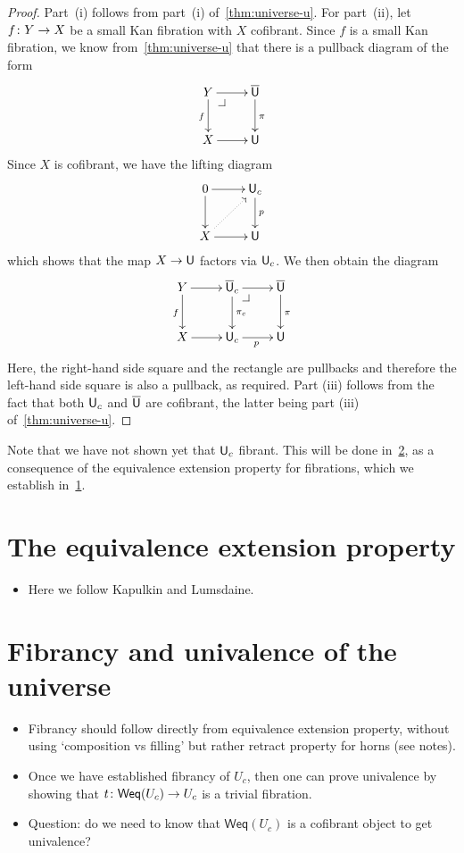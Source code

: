 \documentclass[reqno,10pt,a4paper,oneside,draft]{amsart}
\begin{document}
\begin{proof} Part~(i) follows from part~(i) of~\cref{thm:universe-u}. For part~(ii), 
let $f \colon Y \to X$ be a small Kan fibration with $X$ cofibrant. Since $f$ is a
small Kan fibration, we know 
from~\cref{thm:universe-u} that there is a pullback diagram of the form 
\[
\xymatrix{
Y \ar[r] \ar[d]_f \drpullback & \UU \ar[d]^{\pi} \\
X \ar[r] & \U }
\]
Since $X$ is cofibrant, we have the lifting diagram
\[
\xymatrix{
0 \ar[r] \ar[d] & \U_c \ar[d]^{p} \\
X \ar[r] \ar@{.>}[ur] & \U }
\]
which shows that the map $X \to \mathsf{U}$ factors via $\mathsf{U}_c$.  We then obtain the diagram
\[
\xymatrix{
Y \ar[r] \ar[d]_f &  \UU_c \ar[r]  \ar[d]^{\pi_c} \drpullback & \UU \ar[d]^{\pi} \\
X \ar[r] & \U_c \ar[r]_p &  \U }
\]
Here, the right-hand side square and the rectangle are pullbacks and therefore the left-hand
side square is also a pullback, as required. Part (iii) follows from the fact that both $\mathsf{U}_c$ and
$\overline{\mathsf{U}}$ are cofibrant, the latter being part (iii) of~\cref{thm:universe-u}.
\end{proof} 








Note that we have not shown yet that $\mathsf{U}_c$ fibrant. This will be done in~\cref{sec:fibuu}, as a consequence of the equivalence extension property for fibrations, which we establish in~\cref{sec:equep}.

\newpage

\section{The equivalence extension property}
\label{sec:equep}

\begin{itemize}
\item Here we follow Kapulkin and Lumsdaine.
\end{itemize}

\newpage

\section{Fibrancy and univalence of the universe}
\label{sec:fibuu}

\begin{itemize}
\item Fibrancy should follow directly from equivalence extension property, without using `composition vs filling' but rather retract property for horns (see notes).
\item Once we have established fibrancy of $U_c$, then one can prove univalence by showing that 
$t \colon \mathsf{Weq}(U_c) \to U_c$ is a trivial fibration. 
\item Question: do we need to know that $\mathsf{Weq}(U_c)$ is a cofibrant object to get univalence? 
\end{itemize}
\end{document}
